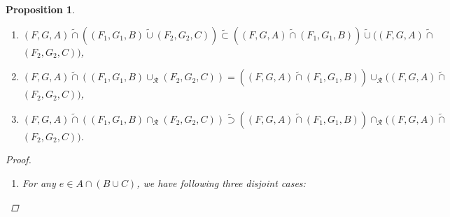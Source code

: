 \documentclass{amsart}
\theoremstyle{plain}
\newtheorem{proposition}{Proposition}
\numberwithin{equation}{section}
\begin{document}
\begin{proposition}
\begin{enumerate}
\item $(F,G,A)\tilde{\cap}((F_{1},G_{1},B)\tilde{\cup}(F_{2},G_{2},C))\tilde{\subset}((F,G,A)\tilde{\cap}(F_{1},G_{1},B))\tilde{\cup}((F,G,A)\tilde{\cap}$
$(F_{2},G_{2},C))$,

\item $(F,G,A)\tilde{\cap}((F_{1},G_{1},B)\cup _{\mathcal{R}}(F_{2},G_{2},C))=((F,G,A)\tilde{\cap}(F_{1},G_{1},B))\cup _{\mathcal{R}}((F,G,A)\tilde{\cap}$ $(F_{2},G_{2},C))$,

\item $(F,G,A)\tilde{\cap}((F_{1},G_{1},B)\cap _{\mathcal{R}}(F_{2},G_{2},C))\tilde{\supset}((F,G,A)\tilde{\cap}(F_{1},G_{1},B))\cap _{\mathcal{R}}((F,G,A)\tilde{\cap}$ $(F_{2},G_{2},C))$.
\end{enumerate}

\begin{proof}
\ \ \ 

\begin{enumerate}
\item For any $e\in A\cap (B\cup C)$, we have following three disjoint cases:


\end{enumerate}
\end{proof}
\end{proposition}
\end{document}
